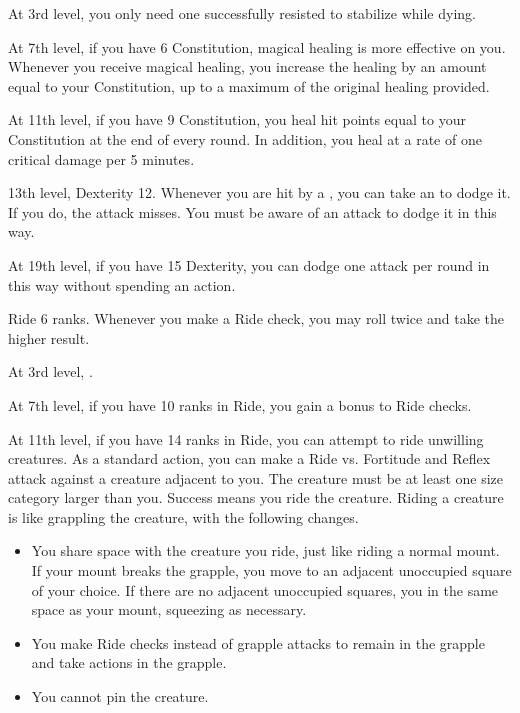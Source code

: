     At 3rd level, you only need one successfully resisted  to stabilize while dying.

    At 7th level, if you have 6 Constitution, magical healing is more effective on you.
    Whenever you receive magical healing, you increase the healing by an amount equal to your Constitution, up to a maximum of the original healing provided.

    At 11th level, if you have 9 Constitution, you heal hit points equal to your Constitution at the end of every round.
    In addition, you heal  at a rate of one critical damage per 5 minutes.
    \magical

    \featpres 13th level, Dexterity 12.
    \featben Whenever you are hit by a , you can take an  to dodge it.
    If you do, the attack misses.
    You must be aware of an attack to dodge it in this way.

    At 19th level, if you have 15 Dexterity, you can dodge one attack per round in this way without spending an action.

    \featpre Ride 6 ranks.
    \featben Whenever you make a Ride check, you may roll twice and take the higher result.

    At 3rd level, \tdash.

    At 7th level, if you have 10 ranks in Ride, you gain a  bonus to Ride checks.

    At 11th level, if you have 14 ranks in Ride, you can attempt to ride unwilling creatures.
    As a standard action, you can make a Ride vs. Fortitude and Reflex attack against a creature adjacent to you.
    The creature must be at least one size category larger than you.
    Success means you ride the creature.
    Riding a creature is like grappling the creature, with the following changes.
    \begin{itemize}
        \item You share space with the creature you ride, just like riding a normal mount.
            If your mount breaks the grapple, you move to an adjacent unoccupied square of your choice.
            If there are no adjacent unoccupied squares, you in the same space as your mount, squeezing as necessary.
        \item You make Ride checks instead of grapple attacks to remain in the grapple and take actions in the grapple.
        \item You cannot pin the creature.
    \end{itemize}

